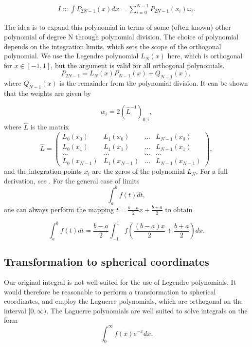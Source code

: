 \documentclass{emulateapj}
\begin{document}
\begin{align}
	I \approx \int P_{2N-1}(x)dx = \sum^{N-1}_{i=0}P_{2N-1}(x_i) \omega_i.
\end{align}

The idea is to expand this polynomial in terms of some (often known) other polynomial of degree N through polynomial division. The choice of polynomial depends on the integration limits, which sets the scope of the orthogonal polynomial. We use the Legendre polynomial $L_N(x)$ here, which is orthogonal for $x\in [-1,1]$, but the argument is valid for all orthogonal polynomials.
\begin{equation}
	P_{2N-1} = L_N(x)P_{N-1}(x) + Q_{N-1}(x),
\end{equation}
where $Q_{N-1}(x)$ is the remainder from the polynomial division. It can be shown that the weights are given by

\begin{equation}
    w_i = 2\left(\hat{L}^{-1}\right)_{0,i},
\end{equation}
where $\hat{L}$ is the matrix
\begin{equation*}
   \hat{L}=\left(\begin{array} {cccc} L_0(x_0)  & L_1(x_0) &\dots &L_{N-1}(x_0)\\
                                   L_0(x_1)  & L_1(x_1) &\dots &L_{N-1}(x_1)\\
                                   \dots  & \dots &\dots &\dots\\
L_0(x_{N-1})  & L_1(x_{N-1}) &\dots &L_{N-1}(x_{N-1})
\end{array}\right),
\end{equation*}
and the integration points $x_i$ are the zeros of the polynomial $L_N$. For a full derivation, see \cite{Lecture1}. For the general case of limits
\begin{equation}
    \int_a^b f(t) dt,
\end{equation}
one can always perform the mapping $t = \frac{b-a}{2}x + \frac{b+a}{2}$ to obtain

\begin{equation*}
  \int_a^bf(t)dt=\frac{b-a}{2}\int_{-1}^1f\left(\frac{(b-a)x}{2}+\frac{b+a}{2}\right)dx.
\end{equation*}

\subsection{Transformation to spherical coordinates}
Our original integral is not well suited for the use of Legendre polynomials. It would therefore be reasonable to perform a transformation to spherical coordinates, and employ the Laguerre polynomials, which are orthogonal on the interval $[0,\infty)$. The Laguerre polynomials are well suited to solve integrals on the form
\begin{equation}
    \int_0^\infty f(x) e^{-x} dx.
\end{equation}
\end{document}
